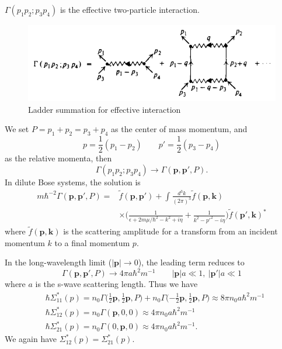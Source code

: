 \documentclass[12pt]{article}
\begin{document}
$\Gamma(p_1p_2;p_3p_4)$ is the effective two-particle interaction.
\begin{figure}[H]
    \centering
    \includegraphics[width=12cm]{p10.png}
    \renewcommand{\figurename}{Fig.}
    \caption{Ladder summation for effective interaction}
    \label{img10}
\end{figure}
\noindent We set $P=p_1+p_2=p_3+p_4$ as the center of mass momentum, and 
\begin{equation*}
    p=\frac{1}{2}(p_1-p_2)\qquad p'=\frac{1}{2}(p_3-p_4)
\end{equation*}
as the relative momenta, then 
\begin{equation*}
    \Gamma(p_1p_2;p_3p_4)\rightarrow\Gamma(\mathbf{p}, \mathbf{p}',P).
\end{equation*}
In dilute Bose systems, the solution is 
\begin{equation}
    \begin{aligned}
        m\hbar^{-2} \Gamma(\mathbf{p},\mathbf{p}',P)=&\tilde{f}(\mathbf{p},
        \mathbf{p}')+\int\frac{d^3 k}{(2\pi)^3}\tilde{f}(\mathbf{p},\mathbf{k})\\
        &\times\bigg(\frac{1}{\epsilon+2m\mu/\hbar^2-k^2+i\eta}+\frac{1}{k^2-p'^2-i\eta}
        \bigg)\tilde{f}(\mathbf{p}',\mathbf{k})^*
        \end{aligned}
\end{equation}
where $\tilde{f}(\mathbf{p},\mathbf{k})$ is the scattering amplitude for a transform from an 
incident momentum $k$ to a final momentum $p$.

In the long-wavelength limit ($|\mathbf{p}|\rightarrow0$), the leading term reduces to 
\begin{equation}
    \Gamma(\mathbf{p},\mathbf{p}',P)\rightarrow 4\pi a\hbar^2m^{-1} \qquad
    |\mathbf{p}|a\ll 1,\ |\mathbf{p}'|a\ll 1
\end{equation}
where $a$ is the s-wave scattering length. Thus we have 
\begin{equation}
    \begin{split}
        &\hbar \Sigma_{11}^*(p)=n_{0} \Gamma\big({\textstyle\frac{1}{2}}\mathbf{p},
        {\textstyle\frac{1}{2}}\mathbf{p}, P\big)+n_0\Gamma\big({-\textstyle\frac{1}{2}}
        \mathbf{p},{\textstyle\frac{1}{2}}\mathbf{p},P\big)\approx8\pi n_0a\hbar^2m^{-1}\\
        &\hbar \Sigma_{12}^*(p)=n_0\Gamma(\mathbf{p},0,0)\approx 4\pi n_0a \hbar^2m^{-1}\\
        &\hbar \Sigma_{21}^*(p)=n_0\Gamma(0,\mathbf{p},0) \approx 4\pi n_0a\hbar^2m^{-1}.
    \end{split}     
\end{equation}
We again have $\Sigma^*_{12}(p)=\Sigma^*_{21}(p)$.
\end{document}
